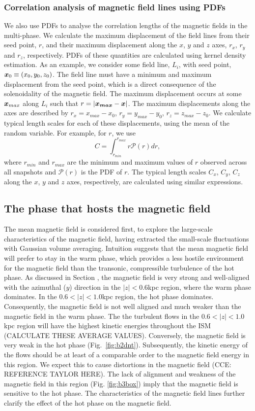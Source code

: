 \documentclass[useAMS,usenatbib]{mn2e}
\begin{document}
\subsubsection{Correlation analysis of magnetic field lines using PDFs}
We also use PDFs to analyse the correlation lengths of the magnetic fields in the multi-phase. We calculate the maximum displacement of the field lines from their seed point, $r$, and their maximum displacement along the $x$, $y$ and $z$ axes, $r_x$, $r_y$ and $r_z$, respectively. PDFs of these quantities are calculated using kernel density estimation. As an example, we consider some field line, $L_i$, with seed point, $\boldsymbol{x}_0\equiv(x_0,y_0,z_0)$. The field line must have a minimum and maximum displacement from the seed point, which is a direct consequence of the solenoidality of the magnetic field. The maximum displacement occurs at some $\boldsymbol{x}_{max}$ along $L_i$ such that $r=|\boldsymbol{x_{max}}-\boldsymbol{x}|$. The maximum displacements along the axes are described by $r_x = x_{max}-x_0$, $r_y = y_{max}-y_0$, $r_z = z_{max}-z_0$. We calculate typical length scales for each of these displacements, using the mean of the random variable. For example, for $r$, we use
\begin{equation}
C = \int_{r_{min}}^{r_{max}}r\mathcal{P}(r)dr,
\end{equation}
where $r_{min}$ and $r_{max}$ are the minimum and maximum values of $r$ observed across all snapshots and $\mathcal{P}(r)$ is the PDF of $r$. The typical length scales $C_x$, $C_y$, $C_z$ along the $x$, $y$ and $z$ axes, respectively, are calculated using similar expressions. 
\subsection{The phase that hosts the magnetic field}
The mean magnetic field is considered first, to explore the large-scale characteristics of the magnetic field, having extracted the small-scale fluctuations with Gaussian volume averaging.  Intuition suggests that the mean magnetic field will prefer to stay in the warm phase, which provides a less hostile environment for the magnetic field than the transonic, compressible turbulence of the hot phase. As discussed in Section \label{sect:3BB}, the magnetic field is very strong and well-aligned with the azimuthal ($y$) direction in the $|z|<0.6$kpc region, where the warm phase dominates. In the $0.6<|z|<1.0$kpc region, the hot phase dominates. Consequently, the magnetic field is not well aligned and much weaker than the magnetic field in the warm phase. The the turbulent flows in the $0.6<|z|<1.0$kpc region will have the highest kinetic energies throughout the ISM (CALCULATE THESE AVERAGE VALUES). Conversely, the magnetic field is very weak in the hot phase (Fig.~\ref{fig:b2dnt}). Subsequently, the kinetic energy of the flows should be at least of a comparable order to the magnetic field energy in this region.  We expect this to cause distortions in the magnetic field (CCE: REFERENCE TAYLOR HERE). The lack of alignment and weakness of the magnetic field in this region (Fig. \ref{fig:b3box}) imply that the magnetic field is sensitive to the hot phase. The characteristics of the magnetic field lines further clarify the effect of the hot phase on the magnetic field.
\end{document}
